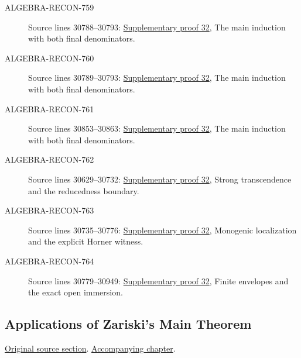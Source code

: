 \begin{description}
\item[ALGEBRA-RECON-759] Source lines 30788--30793: \hyperlink{algebra_zariski_main_notes_20260928}{Supplementary proof 32}, The main induction with both final denominators.
\item[ALGEBRA-RECON-760] Source lines 30789--30793: \hyperlink{algebra_zariski_main_notes_20260928}{Supplementary proof 32}, The main induction with both final denominators.
\item[ALGEBRA-RECON-761] Source lines 30853--30863: \hyperlink{algebra_zariski_main_notes_20260928}{Supplementary proof 32}, The main induction with both final denominators.
\item[ALGEBRA-RECON-762] Source lines 30629--30732: \hyperlink{algebra_zariski_main_notes_20260928}{Supplementary proof 32}, Strong transcendence and the reducedness boundary.
\item[ALGEBRA-RECON-763] Source lines 30735--30776: \hyperlink{algebra_zariski_main_notes_20260928}{Supplementary proof 32}, Monogenic localization and the explicit Horner witness.
\item[ALGEBRA-RECON-764] Source lines 30779--30949: \hyperlink{algebra_zariski_main_notes_20260928}{Supplementary proof 32}, Finite envelopes and the exact open immersion.
\end{description}

\subsection{Applications of Zariski's Main Theorem}
\hypertarget{algebra-source-section-apply-main-theorem}{}
\noindent\href{https://github.com/stacks/stacks-project/blob/a04446e57ec1fbc252a871afcec7752fb2807b14/algebra.tex\#L30954}{Original source section}. \href{algebra.pdf\#nameddest=section-apply-main-theorem}{Accompanying chapter}.

